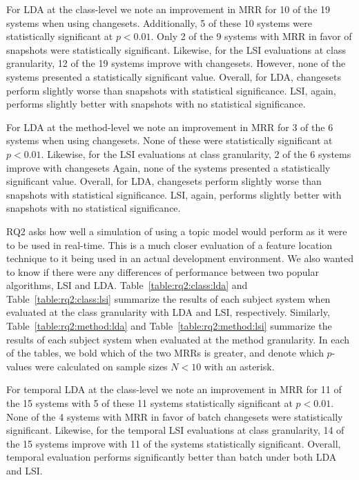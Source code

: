 For LDA at the class-level we note an improvement in MRR for 10 of the 19 systems when using changesets.
Additionally, 5 of these 10 systems were statistically significant at $p<0.01$.
Only 2 of the 9 systems with MRR in favor of snapshots were statistically significant.
Likewise, for the LSI evaluations at class granularity, 12 of the 19 systems improve with changesets.
However, none of the systems presented a statistically significant value.
Overall, for LDA, changesets perform slightly worse than snapshots with statistical significance.
LSI, again, performs slightly better with snapshots with no statistical significance.

For LDA at the method-level we note an improvement in MRR for 3 of the 6 systems when using changesets.
None of these were statistically significant at $p<0.01$.
Likewise, for the LSI evaluations at class granularity, 2 of the 6 systems improve with changesets
Again, none of the systems presented a statistically significant value.
Overall, for LDA, changesets perform slightly worse than snapshots with statistical significance.
LSI, again, performs slightly better with snapshots with no statistical significance.







RQ2 asks how well a simulation of using a topic model would perform as
it were to be used in real-time.
This is a much closer evaluation of a feature location technique to it
being used in an actual development environment.
We also wanted to know if there were any differences of performance
between two popular algorithms, LSI and LDA.
Table~\ref{table:rq2:class:lda} and Table~\ref{table:rq2:class:lsi}
summarize the results of each subject system when
evaluated at the class granularity with LDA and LSI, respectively.
Similarly, Table~\ref{table:rq2:method:lda} and Table~\ref{table:rq2:method:lsi}
summarize the results of each subject system when
evaluated at the method granularity.
In each of the tables, we bold which of the two MRRs is greater,
and denote which $p$-values were calculated on sample sizes $N<10$ with an asterisk.

For temporal LDA at the class-level we note an improvement in MRR for 11 of the 15 systems
with 5 of these 11 systems statistically significant at $p<0.01$.
None of the 4 systems with MRR in favor of batch changesets were statistically significant.
Likewise, for the temporal LSI evaluations at class granularity, 14 of the 15 systems improve
with 11 of the systems statistically significant.
Overall, temporal evaluation performs significantly better than batch under both LDA and LSI.


